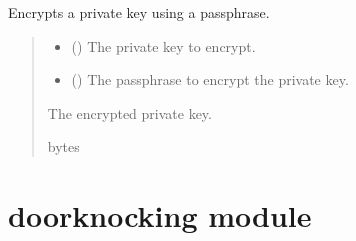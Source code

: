\documentclass[letterpaper,10pt,english]{sphinxmanual}
\begin{document}

\begin{fulllineitems}
\label{\detokenize{client1:client1.encrypt_private_key}}
\pysigstartsignatures
{}
\pysigstopsignatures
\sphinxAtStartPar
Encrypts a private key using a passphrase.
\begin{quote}\begin{description}
\begin{itemize}
\item {} 
\sphinxAtStartPar
{} () \textendash{} The private key to encrypt.

\item {} 
\sphinxAtStartPar
{} () \textendash{} The passphrase to encrypt the private key.

\end{itemize}

\sphinxAtStartPar
The encrypted private key.

\sphinxAtStartPar
bytes

\end{description}\end{quote}

\end{fulllineitems}


\sphinxstepscope


\section{doorknocking module}
\label{\detokenize{doorknocking:module-doorknocking}}\label{\detokenize{doorknocking:doorknocking-module}}\label{\detokenize{doorknocking::doc}}
\end{document}
